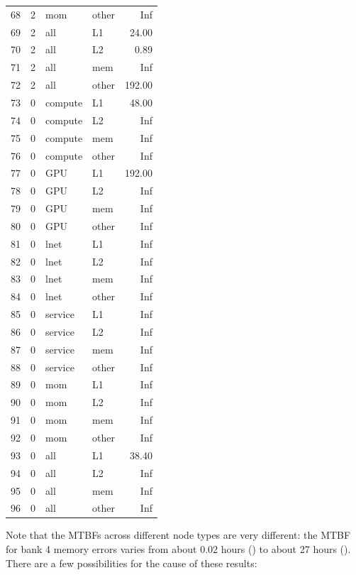 \begin{table}[ht]
\begin{tabular}{rrllr}
  68 &   2 & mom & other & Inf \\ 
  69 &   2 & all & L1 & 24.00 \\ 
  70 &   2 & all & L2 & 0.89 \\ 
  71 &   2 & all & mem & Inf \\ 
  72 &   2 & all & other & 192.00 \\ 
  73 &   0 & compute & L1 & 48.00 \\ 
  74 &   0 & compute & L2 & Inf \\ 
  75 &   0 & compute & mem & Inf \\ 
  76 &   0 & compute & other & Inf \\ 
  77 &   0 & GPU & L1 & 192.00 \\ 
  78 &   0 & GPU & L2 & Inf \\ 
  79 &   0 & GPU & mem & Inf \\ 
  80 &   0 & GPU & other & Inf \\ 
  81 &   0 & lnet & L1 & Inf \\ 
  82 &   0 & lnet & L2 & Inf \\ 
  83 &   0 & lnet & mem & Inf \\ 
  84 &   0 & lnet & other & Inf \\ 
  85 &   0 & service & L1 & Inf \\ 
  86 &   0 & service & L2 & Inf \\ 
  87 &   0 & service & mem & Inf \\ 
  88 &   0 & service & other & Inf \\ 
  89 &   0 & mom & L1 & Inf \\ 
  90 &   0 & mom & L2 & Inf \\ 
  91 &   0 & mom & mem & Inf \\ 
  92 &   0 & mom & other & Inf \\ 
  93 &   0 & all & L1 & 38.40 \\ 
  94 &   0 & all & L2 & Inf \\ 
  95 &   0 & all & mem & Inf \\ 
  96 &   0 & all & other & Inf \\ 
   \hline
\end{tabular}
\end{table}


Note that the MTBFs across different node types are very different: the MTBF for bank 4 memory errors varies from about 0.02 hours () to about 27 hours ().  There are a few possibilities for the cause of these results:

